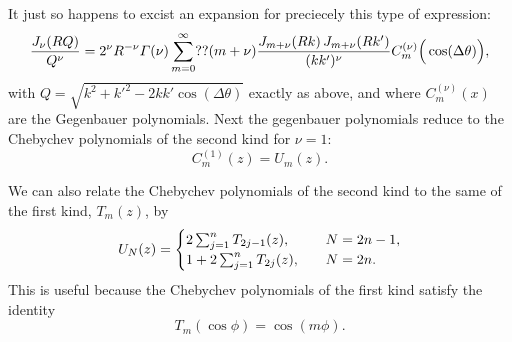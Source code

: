 \documentclass[11pt,a4paper, 
swedish, english %
]{article}
\begin{document}
It just so happens to excist an expansion 
\cite[formula 8.532.1]{Gradshteyn-Ryzhik} for preciecely this type of
expression:
\begin{equation}
\frac{J_\nu\qty(RQ)}{Q^\nu} 
= 2^\nu R^{-\nu} \varGamma(\nu) \sum_{m=0}^\infty ?? (m+\nu) 
\frac{J_{m+\nu}(Rk)\,J_{m+\nu}(Rk')}{(kk')^\nu} 
C_m^{(\nu)}\Big(\cos(\Delta\theta)\Big),
\end{equation}
with $Q=\sqrt{k^2+{k'}^2-2kk'\cos(\Delta\theta)}$ exactly as above,
and where $C_m^{(\nu)}(x)$ are the Gegenbauer polynomials. Next the
gegenbauer polynomials reduce to the Chebychev polynomials of the
second kind for $\nu=1$: \cite[chapter 18.4]{Arfken-Weber}  
\begin{equation}
C_m^{(1)}(z) = U_m(z).
\end{equation}

We can also relate the Chebychev polynomials of the second kind to the
same of the first kind, $T_m(z)$, by
\begin{equation}\label{eq:U2T}
U_N(z) = 
\begin{cases}
2\sum_{j=1}^n T_{2j-1}(z)\qcomma&N=2n-1,\\
1+2\sum_{j=1}^n T_{2j}(z)\qcomma&N=2n.
\end{cases}
\end{equation}
This is useful because the Chebychev polynomials of the first kind
satisfy the identity \cite[chapter 18.4]{Arfken-Weber}
\begin{equation}\label{eq:Tcos}
T_m(\cos\phi) = \cos(m\phi).
\end{equation}
\end{document}
